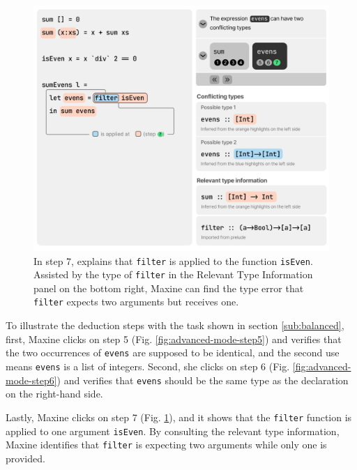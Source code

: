 \begin{figure}
        \centering
        \includegraphics[width=\linewidth,trim=0mm 8mm 0mm 0mm]{images/advanced-mode-3.pdf}
        \caption{
            In step 7, \chameleon{} 
            explains that \texttt{filter} is applied to 
            the function \texttt{isEven}. Assisted by 
            the type of \texttt{filter} in the 
            Relevant Type Information panel on the bottom
            right, Maxine can find the type error that 
            \texttt{filter} expects two arguments but receives one.
        }
        \label{fig:advanced-mode-step7}
\end{figure}


To illustrate the deduction steps with the task shown in section \ref{sub:balanced},  first, Maxine clicks on step 5 (Fig. \ref{fig:advanced-mode-step5}) and verifies
that the two occurrences of \texttt{evens} are supposed to be identical, and the
second use means \texttt{evens} is a list of integers. Second, she
clicks on step 6 (Fig. \ref{fig:advanced-mode-step6}) and verifies that
\texttt{evens} should be the same type as the declaration on the right-hand
side. 


Lastly, Maxine clicks on step 7 (Fig. \ref{fig:advanced-mode-step7}), and
it shows that the \texttt{filter} function is applied to one argument
\texttt{isEven}. By consulting the relevant type information, Maxine identifies
that \texttt{filter} is expecting two arguments while only one is provided. 

